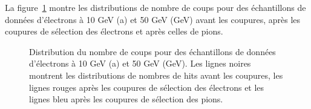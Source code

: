 La figure~\ref{fig.e-Selection} montre les distributions de nombre de coups pour des échantillons de données d'électrons à 10 GeV (a) et 50 GeV (GeV) avant les coupures, après les coupures de sélection des électrons et après celles de pions.
\begin{figure}[!ht]
  \caption{Distribution du nombre de coups pour des échantillons de données d'électrons à 10 GeV (a) et 50 GeV (GeV). Les lignes noires montrent les distributions de nombres de hits avant les coupures, les lignes rouges après les coupures de sélection des électrons et les lignes bleu après les coupures de sélection des pions. \label{fig.e-Selection}}
\end{figure}

